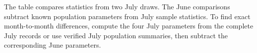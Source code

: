 	The table compares statistics from two July draws. The June comparisons subtract known population parameters from July sample statistics. To find exact month-to-month differences, compute the four July parameters from the complete July records or use verified July population summaries, then subtract the corresponding June parameters.




